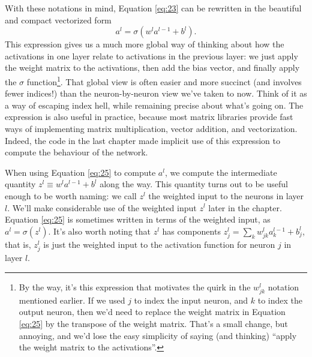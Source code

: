\documentclass[a4paper,twoside,10pt]{book}
\begin{document}
With these notations in mind, Equation \ref{eq:23} can be rewritten in the beautiful and compact vectorized form
\begin{equation}
a^{l} = \sigma(w^l a^{l-1}+b^l).
\label{eq:25}
\end{equation}
This expression gives us a much more global way of thinking about how the activations in one layer relate to activations in the previous layer: we just apply the weight matrix to the activations, then add the bias vector, and finally apply the $\sigma$ function\footnote{By the way, it's this expression that motivates the quirk in the $w^l_{jk}$ notation mentioned earlier. If we used $j$ to index the input neuron, and $k$ to index the output neuron, then we'd need to replace the weight matrix in Equation \ref{eq:25} by the transpose of the weight matrix. That's a small change, but annoying, and we'd lose the easy simplicity of saying (and thinking) ``apply the weight matrix to the activations''.}. That global view is often easier and more succinct (and involves fewer indices!) than the neuron-by-neuron view we've taken to now. Think of it as a way of escaping index hell, while remaining precise about what's going on. The expression is also useful in practice, because most matrix libraries provide fast ways of implementing matrix multiplication, vector addition, and vectorization. Indeed, the code in the last chapter made implicit use of this expression to compute the behaviour of the network.

When using Equation \ref{eq:25} to compute $a^l$, we compute the intermediate quantity $z^l \equiv w^l a^{l-1}+b^l$ along the way. This quantity turns out to be useful enough to be worth naming: we call $z^l$ the weighted input to the neurons in layer $l$. We'll make considerable use of the weighted input $z^l$ later in the chapter. Equation \ref{eq:25} is sometimes written in terms of the weighted input, as $a^l=\sigma(z^l)$. It's also worth noting that $z^l$ has components $z^l_j= \sum_k w^l_{jk} a^{l-1}_k+b^l_j$, that is, $z^l_j$ is just the weighted input to the activation function for neuron $j$ in layer $l$.
\end{document}
